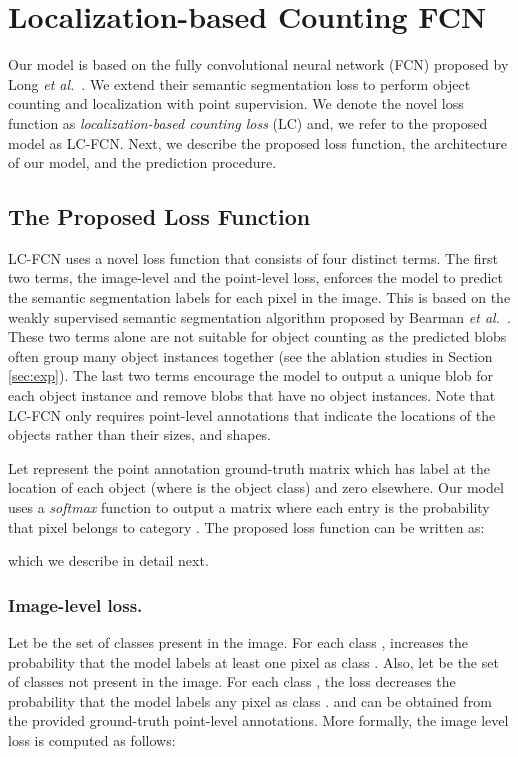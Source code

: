\documentclass[runningheads]{llncs}
\begin{document}
\section{Localization-based Counting FCN}
\label{sec:loss}

Our model is based on the fully convolutional neural network (FCN) proposed by Long \emph{et al.}~\cite{long2015fully}. We extend their semantic segmentation loss to perform object counting and localization with point supervision. We denote the novel loss function as \emph{localization-based counting loss} (LC) and, we refer to the proposed model as LC-FCN. Next, we describe the proposed loss function, the architecture of our model, and the prediction procedure.



\subsection{The Proposed Loss Function}
LC-FCN uses a novel loss function that consists of four distinct terms. The first two terms, the image-level and the point-level loss, enforces the model to predict the semantic segmentation labels for each pixel in the image. This is based on the weakly supervised semantic segmentation algorithm proposed by Bearman \emph{et al.}~\cite{bearman2016s}. These two terms alone are not suitable for object counting as the predicted blobs often group many object instances together (see the ablation studies in Section \ref{sec:exp}). The last two terms encourage the model to output a unique blob for each object instance and remove blobs that have no object instances. Note that LC-FCN only requires point-level annotations that indicate the locations of the objects rather than their sizes, and shapes.


Let  represent the point annotation ground-truth matrix which has label  at the location of each object (where  is the object class) and zero elsewhere. Our model uses a  \emph{softmax} function to output a matrix  where each entry  is the probability that pixel  belongs to category . The proposed loss function can be written as:

which we describe in detail next.

\subsubsection{Image-level loss.} Let  be the set of classes present in the image. For each class ,  increases the probability that the model labels at least one pixel as class . Also, let  be the set of classes not present in the image. For each class , the loss decreases the probability that the model labels any pixel as class .  and  can be obtained from the provided ground-truth point-level annotations. More formally, the image level loss is computed as follows:
\end{document}
